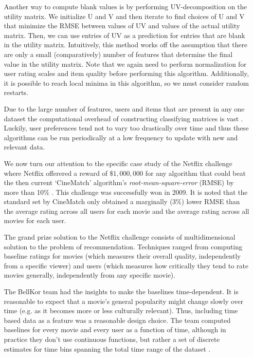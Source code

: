 \documentclass[11pt]{article}
\begin{document}
\par Another way to compute blank values is by performing UV-decomposition on the utility matrix. We initialize U and V and then iterate to find choices of U and V that minimize the RMSE between values of UV and values of the actual utility matrix. Then, we can use entries of UV as a prediction for entries that are blank in the utility matrix. Intuitively, this method works off the assumption that there are only a small (comparatively) number of features that determine the final value in the utility matrix. Note that we again need to perform normalization for user rating scales and item quality before performing this algorithm. Additionally, it is possible to reach local minima in this algorithm, so we must consider random restarts.
 \par Due to the large number of features, users and items that are present in any one dataset the computational overhead of constructing classifying matrices is vast \cite{chapter9}. Luckily, user preferences tend not to vary too drastically over time and thus these algorithms can be run periodically at a low frequency to update with new and relevant data.
\par We now turn our attention to the specific case study of the Netflix challenge where Netflix offerered a reward of $\$1,000,000$ for any algorithm that could beat the then current `CineMatch' algorithm's \textit{root-mean-square-error} (RMSE) by more than 10\% \cite{chapter9}. This challenge was successfully won in 2009. It is noted that the standard set by CineMatch only obtained a marginally (3\%) lower RMSE than the average rating across all users for each movie and the average rating across all movies for each user.
\par The grand prize solution to the Netflix challenge \cite{netflix} consists of multidimensional solution to the problem of recommendation. Techniques ranged from computing baseline ratings for movies (which measures their overall quality, independently from a specific viewer) and users (which measures how critically they tend to rate movies generally, independently from any specific movie).
\par
The BellKor team had the insights to make the baselines time-dependent. It is reasonable to expect that a movie's general popularity might change slowly over time (e.g. as it becomes more or less culturally relevant). Thus, including time based data as a feature was a reasonable design choice. The team computed baselines for every movie and every user as a function of time, although in practice they don't use continuous functions, but rather a set of discrete estimates for time bins spanning the total time range of the dataset \cite{netflix}.
\end{document}
